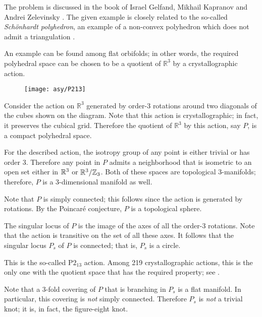 The problem is discussed in the book of 
Israel Gelfand, 
Mikhail Kapranov 
and Andrei Zelevinsky  \cite[see 7C in][]{GKZ}.
The given example is closely related to the so-called \emph{Sch\"onhardt polyhedron}, an example of a non-convex polyhedron which does not admit a triangulation \cite{schoenhardt}.

An example can be found among flat orbifolds;
in other words, the required polyhedral space can be chosen to be a quotient of $\mathbb{R}^3$ by a crystallographic action.

\begin{wrapfigure}{r}{23 mm}
\vskip-4mm
\centering
\texttt{[image: asy/P213]}
\end{wrapfigure}

\medskip

Consider the action on $\mathbb{R}^3$ generated by order-3 rotations around two diagonals of the cubes shown on the diagram.
Note that this action is crystallographic;
in fact, it preserves the cubical grid.
Therefore the quotient of $\mathbb{R}^3$ by this action, say $P$, is a compact polyhedral space.

For the described action,
the isotropy group of any point is either trivial or has order 3.
Therefore any point in $P$ admits a neighborhood that is isometric to an open set either in $\mathbb{R}^3$ or $\mathbb{R}^3/\mathbb{Z}_3$.
Both of these spaces are topological 3-manifolds;
therefore, $P$ is a 3-dimensional manifold as well. 

Note that $P$ is simply connected;
this follows since the action is generated by rotations. 
By the Poincaré conjecture, $P$ is a topological sphere.

The singular locus of $P$ is the image of the axes of all the order-3 rotations.
Note that the action is transitive on the set of all these axes.
It follows that the singular locus $P_s$ of $P$ is connected; that is, $P_s$ is a circle.

\medskip

This is the so-called P$2_13$ action.
Among 219 crystallographic actions, this is the only one with the quotient space that has the required property; see \cite{dunbar}.

Note that a 3-fold covering of $P$ that is branching in $P_s$ is a flat manifold. 
In particular, this covering is \emph{not} simply connected.
Therefore $P_s$ is \emph{not} a trivial knot;
it is, in fact, the figure-eight knot.

